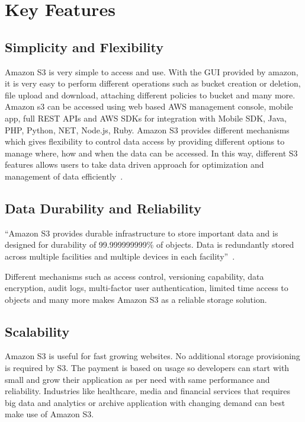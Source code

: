 \section{Key Features}


\subsection{Simplicity and Flexibility} 

Amazon S3 is very simple to access and use. With the GUI provided by
amazon, it is very easy to perform different operations such as bucket
creation or deletion, file upload and download, attaching different
policies to bucket and many more. Amazon s3 can be accessed using web
based AWS management console, mobile app, full REST APIs and AWS SDKs
for integration with Mobile SDK, Java, PHP, Python, NET, Node.js,
Ruby. Amazon S3 provides different mechanisms which gives flexibility
to control data access by providing different options to manage where,
how and when the data can be accessed. In this way, different S3
features allows users to take data driven approach for optimization
and management of data efficiently~\cite{hid-sp18-420-amazon-S3-FAQ}.


\subsection{Data Durability and Reliability} 

``Amazon S3 provides durable infrastructure to store important data
and is designed for durability of 99.999999999\% of objects. Data is
redundantly stored across multiple facilities and multiple devices in
each facility''~\cite{hid-sp18-420-amazon-S3}.

Different mechanisms such as access control, versioning capability,
data encryption, audit logs, multi-factor user authentication, limited
time access to objects and many more makes Amazon S3 as a reliable
storage solution.

\subsection{Scalability}

Amazon S3 is useful for fast growing websites. No additional storage
provisioning is required by S3. The payment is based on usage so
developers can start with small and grow their application as per need
with same performance and reliability.  Industries like healthcare,
media and financial services that requires big data and analytics or
archive application with changing demand can best make use of Amazon
S3.

